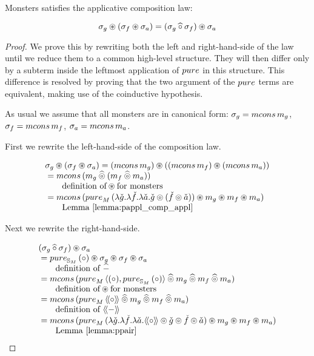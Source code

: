 \begin{lemma}
Monsters satisfies the applicative composition law:

$$
\sigma_g \circledast (\sigma_f \circledast \sigma_a)
 = 
(\sigma_g \mathbin{\widehat{\circ}} \sigma_f) \circledast \sigma_a
$$
\end{lemma}
\begin{proof}
We prove this by rewriting both the left and right-hand-side of the law
until we reduce them to a common high-level structure.
They will then differ only by a subterm inside the leftmost application of $\apure$ in this structure.
This difference is resolved by proving that the two argument of the $\apure$ terms are equivalent, making use of the coinductive hypothesis.

As usual we assume that all monsters are in canonical form: $\sigma_g = \mcons\,m_g$, $\sigma_f = \mcons\,m_f$, $\sigma_a = \mcons\,m_a$.

First we rewrite the left-hand-side of the composition law. 

$$
\begin{array}{l}
\sigma_g \appl (\sigma_f \appl \sigma_a)
 = (\mcons\,m_g) \appl ((\mcons\,m_f) \appl (\mcons\,m_a))\\
{}= \mcons\,(m_g \alift{\pappl} (m_f \alift{\pappl} m_a))\\
  \qquad  \mbox{definition of}\appl\mbox{for monsters} \\
{}= \mcons\,(
\apure_M\, (\lambda \pstr{g}. \lambda \pstr{f}. \lambda \pstr{a}. \pstr{g} \pappl (\pstr{f}\pappl \pstr{a})) \appl m_g \appl m_f \appl m_a
)\\
  \qquad \mbox{Lemma \ref{lemma:pappl_comp_appl}}
\end{array}
$$

Next we rewrite the right-hand-side.

$$
\begin{array}{l}
(\sigma_g \alift{\comp} \sigma_f) \appl \sigma_a\\
{}= \apure_{\stream{M}}\,(\comp) \appl \sigma_g \appl \sigma_f \appl \sigma_a \\
  \qquad \mbox{definition of }\alift{-}\\
{}= \mcons\, (\apure_M\,\pair{(\comp)}{\apure_{\stream{M}}\,(\comp)} \alift{\pappl} m_g \alift{\pappl} m_f \alift{\pappl} m_a)\\
  \qquad \mbox{definition of}\appl\mbox{for monsters}\\
{}= \mcons\, (\apure_M\,\ppair{\comp} \alift{\pappl} m_g \alift{\pappl} m_f \alift{\pappl} m_a)\\
  \qquad \mbox{definition of }\ppair{-}\\
{}= \mcons\,(
\apure_M\,(\lambda \pstr{g}. \lambda \pstr{f}. \lambda \pstr{a}. \ppair{\comp} \pappl \pstr{g}  \pappl \pstr{f}  \pappl \pstr{a}) \appl m_g \appl m_f \appl m_a)\\
  \qquad \mbox{Lemma \ref{lemma:ppair}}
\end{array}
$$


\end{proof}
